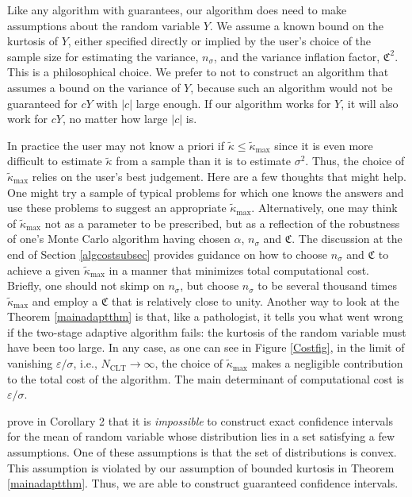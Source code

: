 \documentclass[graybox]{svmult}
\newcommand{\fudge}{\mathfrak{C}}
\newcommand{\abs}[1]{\left|#1\right|}
\newcommand{\tkappa}{\tilde{\kappa}}
\def\abs#1{\ensuremath{\left \lvert #1 \right \rvert}}
\begin{document}
Like any algorithm with guarantees, our algorithm does need to make assumptions about the random variable $Y$.  We assume a known bound on the kurtosis of $Y$, either specified directly or implied by the user's choice of the sample size for estimating the variance, $n_\sigma$, and the variance inflation factor, $\fudge^2$.  This is a philosophical choice.  We prefer to not to construct an algorithm that assumes a bound on the variance of $Y$, because such an algorithm would not be guaranteed for $cY$ with $\abs{c}$ large enough.  If our algorithm works for $Y$, it will also work for $cY$, no matter how large $\abs{c}$ is. 

In practice the user may not know a priori if $\tkappa \le \tkappa_{\max}$ since it is even more difficult to estimate $\tkappa$ from a sample than it is to estimate $\sigma^2$.  Thus, the choice of $\tkappa_{\max}$ relies on the user's best judgement.  Here are a few thoughts that might help.  One might try a sample of typical problems for which one knows the answers and use these problems to suggest an appropriate $\tkappa_{\max}$.  Alternatively, one may think of $\tkappa_{\max}$ not as a parameter to be prescribed, but as a reflection of the robustness of one's Monte Carlo algorithm having chosen $\alpha$, $n_\sigma$ and $\fudge$.  The discussion at the end of Section \ref{algcostsubsec} provides guidance on how to choose $n_\sigma$ and $\fudge$ to achieve a given $\tkappa_{\max}$ in a manner that minimizes total computational cost.  Briefly, one should not skimp on $n_\sigma$, but choose $n_\sigma$ to be several thousand times $\tkappa_{\max}$ and employ a $\fudge$ that is relatively close to unity.  Another way to look at the Theorem \ref{mainadaptthm} is that, like a pathologist, it tells you what went wrong if the two-stage adaptive algorithm fails: the kurtosis of the random variable must have been too large.
In any case, as one can see in Figure \ref{Costfig}, in the limit of vanishing $\varepsilon/\sigma$, i.e., $N_{\text{CLT}} \to \infty$, the choice of $\tkappa_{\max}$ makes a negligible contribution to the total cost of the algorithm.  The main determinant of computational cost is $\varepsilon/\sigma$.

\cite{BahSav56} prove in Corollary 2 that it is \emph{impossible} to construct exact confidence intervals for the mean of random variable whose distribution lies in a set satisfying a few assumptions. One of these assumptions is that the set of distributions is convex.  This assumption is violated by our assumption of bounded kurtosis in Theorem \ref{mainadaptthm}. Thus, we are able to construct guaranteed confidence intervals.
\end{document}
